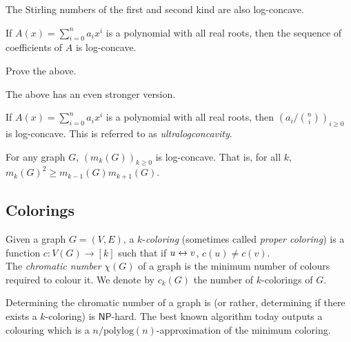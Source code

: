 	The Stirling numbers of the first and second kind are also log-concave.

	\begin{fprop}
		If $A(x) = \sum_{i=0}^n a_i x^i$ is a polynomial with all real roots, then the sequence of coefficients of $A$ is log-concave.
	\end{fprop}

	\begin{exercise}
		Prove the above.
	\end{exercise}

	The above has an even stronger version.

	\begin{fprop}
		If $A(x) = \sum_{i=0}^n a_i x^i$ is a polynomial with all real roots, then $\left(a_i/\binom{n}{i}\right)_{i \ge 0}$ is log-concave. This is referred to as \emph{ultralogconcavity}.
	\end{fprop}

	\begin{fcor}
		For any graph $G$, $(m_k(G))_{k\ge 0}$ is log-concave. That is, for all $k$, $m_k(G)^2 \ge m_{k-1}(G)m_{k+1}(G)$.
	\end{fcor}





\subsection{Colorings}

	\begin{fdef}
		Given a graph $G=(V,E)$, a $k$-\emph{coloring} (sometimes called \emph{proper coloring}) is a function $c:V(G)\to[k]$ such that if $u\leftrightarrow v$, $c(u) \ne c(v)$.\\
		The \emph{chromatic number} $\chi(G)$ of a graph is the minimum number of colours required to colour it.
		We denote by $c_k(G)$ the number of $k$-colorings of $G$.
	\end{fdef}

	Determining the chromatic number of a graph is (or rather, determining if there exists a $k$-coloring) is $\mathsf{NP}$-hard. The best known algorithm today outputs a colouring which is a $n/\text{polylog}(n)$-approximation of the minimum coloring.

